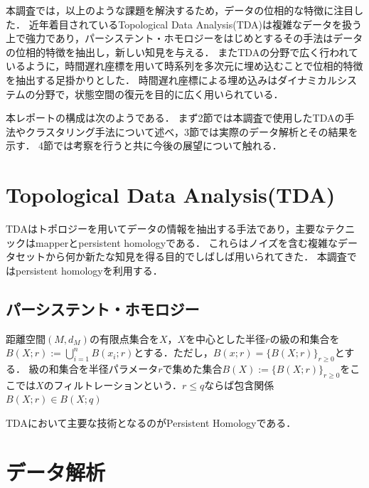 \documentclass{jarticle}
\begin{document}
本調査では，以上のような課題を解決するため，データの位相的な特徴に注目した．
近年着目されているTopological Data Analysis(TDA)は複雑なデータを扱う上で強力であり，パーシステント・ホモロジーをはじめとするその手法はデータの位相的特徴を抽出し，新しい知見を与える．
またTDAの分野で広く行われているように，時間遅れ座標を用いて時系列を多次元に埋め込むことで位相的特徴を抽出する足掛かりとした．
時間遅れ座標による埋め込みはダイナミカルシステムの分野で，状態空間の復元を目的に広く用いられている．

本レポートの構成は次のようである．
まず2節では本調査で使用したTDAの手法やクラスタリング手法について述べ，3節では実際のデータ解析とその結果を示す．
4節では考察を行うと共に今後の展望について触れる．

\section{Topological Data Analysis(TDA)}
TDAはトポロジーを用いてデータの情報を抽出する手法であり，主要なテクニックはmapperとpersistent homologyである．
これらはノイズを含む複雑なデータセットから何か新たな知見を得る目的でしばしば用いられてきた．
本調査ではpersistent homologyを利用する．

\subsection{パーシステント・ホモロジー}
距離空間$(M, d_M)$の有限点集合を$X$，$X$を中心とした半径$r$の級の和集合を$B(X;r):=\bigcup_{i=1}^n B(x_i;r)$とする．ただし，$B(x;r) = \{B(X;r)\}_{r\geq 0 }$とする．
級の和集合を半径パラメータ$r$で集めた集合$B(X):=\{B(X;r)\}_{r\geq 0}$をここでは$X$のフィルトレーションという．$r\leq q$ならば包含関係$B(X;r)\in B(X;q)$





TDAにおいて主要な技術となるのがPersistent Homology\cite{Edelsbrunner2002}である．



\section{データ解析}
\end{document}
